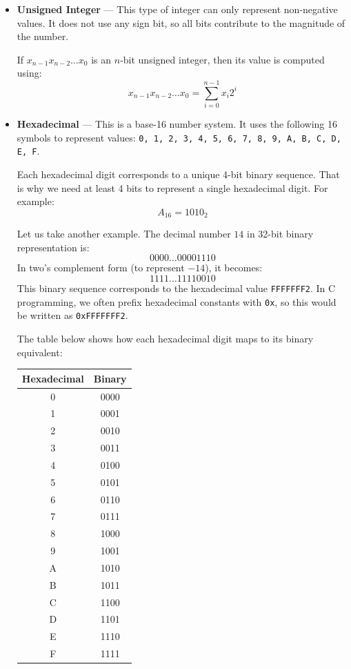 \documentclass[12pt]{book}
\begin{document}
\begin{itemize}
    \item \textbf{Unsigned Integer} — This type of integer can only represent non-negative values. It does not use any sign bit, so all bits contribute to the magnitude of the number.

    If $x_{n-1}x_{n-2}\ldots x_0$ is an $n$-bit unsigned integer, then its value is computed using:
    \begin{equation} \label{eq:unsigned}
        x_{n-1}x_{n-2}\ldots x_0 = \sum_{i=0}^{n-1} x_i 2^i
    \end{equation}

\item \textbf{Hexadecimal} — This is a base-16 number system. It uses the following 16 symbols to represent values: \texttt{0, 1, 2, 3, 4, 5, 6, 7, 8, 9, A, B, C, D, E, F}.

Each hexadecimal digit corresponds to a unique 4-bit binary sequence. That is why we need at least 4 bits to represent a single hexadecimal digit. For example:
\[
A_{16} = 1010_2
\]

Let us take another example. The decimal number $14$ in 32-bit binary representation is:
\[
0000\ldots00001110
\]
In two's complement form (to represent $-14$), it becomes:
\[
1111\ldots11110010
\]
This binary sequence corresponds to the hexadecimal value \texttt{FFFFFFF2}. In C programming, we often prefix hexadecimal constants with \texttt{0x}, so this would be written as \texttt{0xFFFFFFF2}.

\medskip
The table below shows how each hexadecimal digit maps to its binary equivalent:

\begin{center}
\begin{tabular}{|c|c|}
\hline
\textbf{Hexadecimal} & \textbf{Binary} \\
\hline
0 & 0000 \\
1 & 0001 \\
2 & 0010 \\
3 & 0011 \\
4 & 0100 \\
5 & 0101 \\
6 & 0110 \\
7 & 0111 \\
8 & 1000 \\
9 & 1001 \\
A & 1010 \\
B & 1011 \\
C & 1100 \\
D & 1101 \\
E & 1110 \\
F & 1111 \\
\hline
\end{tabular}
\end{center}


\end{itemize}
\end{document}
